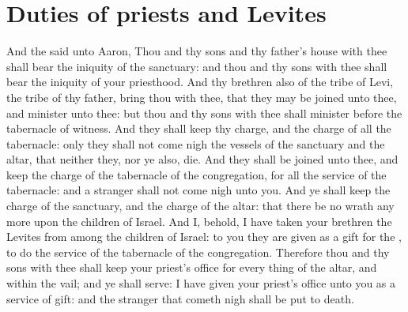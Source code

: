 \section*{Duties of priests and Levites}
\begin{biblechapter} %
\verse And the \LORD said unto Aaron, Thou and thy sons and thy father's house with thee shall bear the iniquity of the sanctuary: and thou and thy sons with thee shall bear the iniquity of your priesthood.
\verse And thy brethren also of the tribe of Levi, the tribe of thy father, bring thou with thee, that they may be joined unto thee, and minister unto thee: but thou and thy sons with thee shall minister before the tabernacle of witness.
\verse And they shall keep thy charge, and the charge of all the tabernacle: only they shall not come nigh the vessels of the sanctuary and the altar, that neither they, nor ye also, die.
\verse And they shall be joined unto thee, and keep the charge of the tabernacle of the congregation, for all the service of the tabernacle: and a stranger shall not come nigh unto you.
\verse And ye shall keep the charge of the sanctuary, and the charge of the altar: that there be no wrath any more upon the children of Israel.
\verse And I, behold, I have taken your brethren the Levites from among the children of Israel: to you they are given as a gift for the \LORD, to do the service of the tabernacle of the congregation.
\verse Therefore thou and thy sons with thee shall keep your priest's office for every thing of the altar, and within the vail; and ye shall serve: I have given your priest's office unto you as a service of gift: and the stranger that cometh nigh shall be put to death.

\end{biblechapter}
